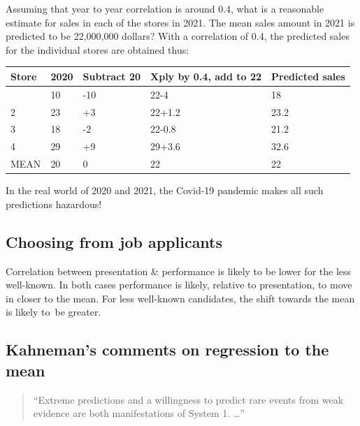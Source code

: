 \documentclass[
  10pt,
  b5paper]{book}
\begin{document}
Assuming that year to year correlation is around 0.4,
what is a reasonable estimate for sales in each of the
stores in 2021. The mean sales amount in 2021 is predicted
to be 22,000,000 dollars? With a correlation of 0.4, the
predicted sales for the individual stores are obtained thus:

\begin{longtable}[]{@{}lllll@{}}
\toprule\noalign{}
Store & 2020 & Subtract 20 & Xply by 0.4, add to 22 & Predicted sales \\
\midrule\noalign{}
\endhead
\bottomrule\noalign{}
\endlastfoot
1 & 10 & -10 & 22-4 & 18 \\
2 & 23 & +3 & 22+1.2 & 23.2 \\
3 & 18 & -2 & 22-0.8 & 21.2 \\
4 & 29 & +9 & 29+3.6 & 32.6 \\
MEAN & 20 & 0 & 22 & 22 \\
\end{longtable}

In the real world of 2020 and 2021, the Covid-19 pandemic makes all such
predictions hazardous!

\hypertarget{choosing-from-job-applicants}{%
\subsection*{Choosing from job applicants}\label{choosing-from-job-applicants}}

Correlation between presentation \& performance is likely to
be lower for the less well-known. In both cases performance
is likely, relative to presentation, to move in closer to the
mean. For less well-known candidates, the shift towards the
mean is likely to~be greater.

\hypertarget{kahnemans-comments-on-regression-to-the-mean}{%
\subsection*{Kahneman's comments on regression to the mean}\label{kahnemans-comments-on-regression-to-the-mean}}

\begin{quote}
``Extreme predictions and a willingness to predict rare events from
weak evidence are both manifestations of System 1. \ldots{}''
\end{quote}
\end{document}
